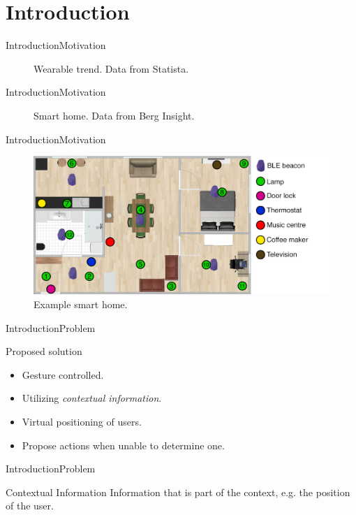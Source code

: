 \section{Introduction}
\begin{frame}{Introduction}{Motivation}
  \begin{figure}[!hbt]
    \centering
    \scalebox{.7}{}
    \caption{Wearable trend. Data from Statista.}
  \end{figure}
\end{frame}

\begin{frame}{Introduction}{Motivation}
  \begin{figure}[!hbt]
    \centering
    \scalebox{.7}{}
    \caption{Smart home. Data from Berg Insight.}
  \end{figure}
\end{frame}

\begin{frame}{Introduction}{Motivation}
\begin{figure}[h]
\centering
\includegraphics[width=\textwidth]{../images/room-with-beacons}
\caption{Example smart home.}
\end{figure}
\end{frame}

\begin{frame}{Introduction}{Problem}
\begin{block}{Proposed solution}
  \begin{itemize}
    \item Gesture controlled.
    \item Utilizing \emph{contextual information}.
    \item Virtual positioning of users.
    \item Propose actions when unable to determine one.
  \end{itemize}
\end{block}
\end{frame}

\begin{frame}{Introduction}{Problem}
\begin{block}{Contextual Information}
Information that is part of the context, e.g. the position of the user.
\end{block}
\end{frame}

